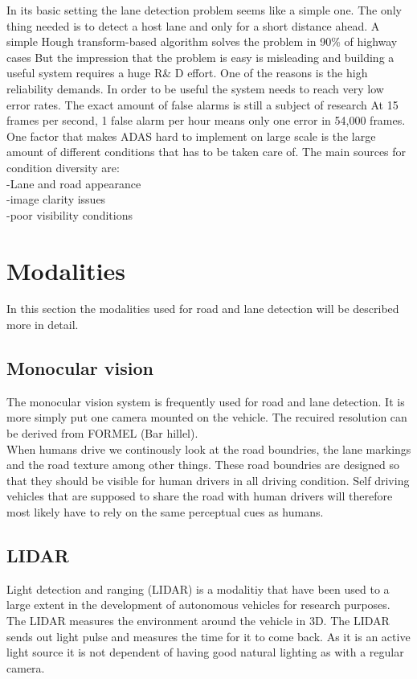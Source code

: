 In its basic setting the lane detection problem seems like a simple one. The only thing needed is to detect a host lane and only for a short distance ahead. A simple Hough transform-based algorithm solves the problem in 90\% of highway cases %
But the impression that the problem is easy is misleading and building a useful system requires a huge R\& D effort. One of the reasons is the high reliability demands. In order to be useful the system needs to reach very low error rates. The exact amount of false alarms is still a subject of research %
At 15 frames per second, 1 false alarm per hour means only one error in 54,000 frames. \\


One factor that makes ADAS hard to implement on large scale is the large amount of different conditions that has to be taken care of. The main sources for condition diversity are:\\
-Lane and road appearance\\
-image clarity issues\\
-poor visibility conditions\\

\section{Modalities}
In this section the modalities used for road and lane detection will be described more in detail.

\subsection{Monocular vision}
The monocular vision system is frequently used for road and lane detection. It is more simply put one camera mounted on the vehicle. The recuired resolution can be derived from FORMEL (Bar hillel).\\
When humans drive we continously look at the road boundries, the lane markings and the road texture among other things. These road boundries are designed so that they should be visible for human drivers in all driving condition. Self driving vehicles that are supposed to share the road with human drivers will therefore most likely have to rely on the same perceptual cues as humans. 
\subsection{LIDAR}
Light detection and ranging (LIDAR) is a modalitiy that have been used to a large extent in the development of autonomous vehicles for research purposes. The LIDAR measures the environment around the vehicle in 3D. The LIDAR sends out light pulse and measures the time for it to come back. As it is an active light source it is not dependent of having good natural lighting as with a regular camera. \\

